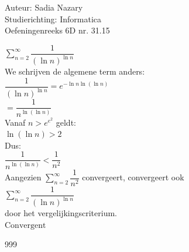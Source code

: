 \documentclass[a4paper]{article}
\begin{document}
\noindent \large Auteur: Sadia Nazary \\
\noindent \large Studierichting: Informatica\\
\noindent \large Oefeningenreeks 6D nr. 31.15\\

\medskip

\normalsize

$\displaystyle\sum\limits_{n=2}^{\infty}\dfrac{1}{(\ln n)^{\ln n}}$\\

We schrijven de algemene term anders:\\

$\dfrac{1}{(\ln n)^{\ln n}}
=
e^{-\ln n\ln(\ln n)}$\\

$=
\dfrac{1}{n^{\ln(\ln n)}}$\\

Vanaf $n>e^{e^2}$ geldt:\\

$\ln(\ln n)>2$\\

Dus:\\

$\dfrac{1}{n^{\ln(\ln n)}}<\dfrac{1}{n^2}$\\

Aangezien $\displaystyle\sum\limits_{n=2}^{\infty}\dfrac{1}{n^2}$ convergeert, convergeert ook\\

$\displaystyle\sum\limits_{n=2}^{\infty}\dfrac{1}{(\ln n)^{\ln n}}$\\

door het vergelijkingscriterium.\\

$\boxed{\text{Convergent}}$

\begin{thebibliography}{999}
\end{thebibliography}
\end{document}

